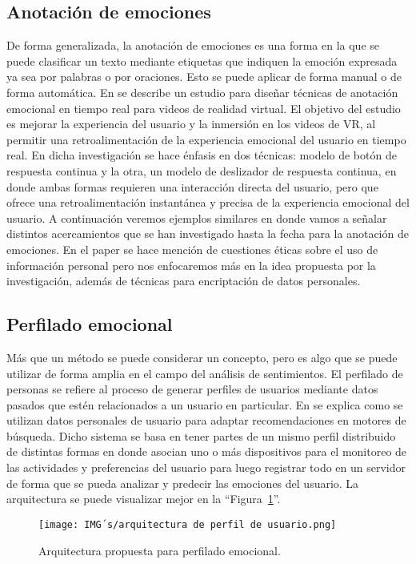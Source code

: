 \documentclass[12pt, conference]{IEEEtran}
\begin{document}
\subsection{Anotación de emociones}
De forma generalizada, la anotación de emociones es una forma en la que se puede clasificar un texto mediante etiquetas que indiquen la emoción expresada ya sea por palabras o por oraciones. Esto se puede aplicar de forma manual o de forma automática. En \cite{f3} se describe un estudio para diseñar técnicas de anotación emocional en tiempo real para videos de realidad virtual. El objetivo del estudio es mejorar la experiencia del usuario y la inmersión en los videos de VR, al permitir una retroalimentación de la experiencia emocional del usuario en tiempo real. En dicha investigación se hace énfasis en dos técnicas: modelo de botón de respuesta continua y la otra, un modelo de deslizador de respuesta continua, en donde ambas formas requieren una interacción directa del usuario, pero que ofrece una retroalimentación instantánea y precisa de la experiencia emocional del usuario. A continuación veremos ejemplos similares en donde vamos a señalar distintos acercamientos que se han investigado hasta la fecha para la anotación de emociones. En el paper se hace mención de cuestiones éticas sobre el uso de información personal pero nos enfocaremos más en la idea propuesta por la investigación, además de técnicas para encriptación de datos personales.

\subsection{Perfilado emocional}
Más que un método se puede considerar un concepto, pero es algo que se puede utilizar de forma amplia en el campo del análisis de sentimientos. El perfilado de personas se refiere al proceso de generar perfiles de usuarios mediante datos pasados que estén relacionados a un usuario en particular. En \cite{f12} se explica como se utilizan datos personales de usuario para adaptar recomendaciones en motores de búsqueda. Dicho sistema se basa en tener partes de un mismo perfil distribuido de distintas formas en donde asocian uno o más dispositivos para el monitoreo de las actividades y preferencias del usuario para luego registrar todo en un servidor de forma que se pueda analizar y predecir las emociones del usuario. La arquitectura se puede visualizar mejor en la ``Figura~\ref{fig10}''.
\begin{figure}[htbp]
  \caption{Arquitectura propuesta para perfilado emocional.}
  \centerline{\texttt{[image: IMG´s/arquitectura de perfil de usuario.png]}}
  \label{fig10}
\end{figure}
\end{document}
